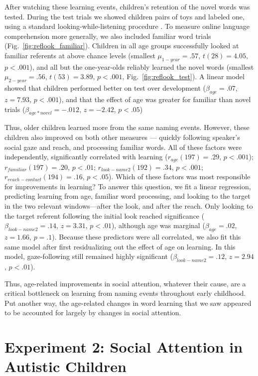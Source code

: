 \documentclass{pnastwo}
\begin{document}
\begin{article}
After watching these learning events, children's retention of the novel words was tested. During the test trials we showed children pairs of toys and labeled one, using a standard looking-while-listening procedure \cite{fernald1998, fernald2008}. To measure online language comprehension more generally, we also included familiar word trials (Fig.~\ref{fig:reflook_familiar}). Children in all age groups successfully looked at familiar referents at above chance levels (smallest $\mu_{1-year} = .57$, $t(28) = 4.05$, $p < .001$), and all but the one-year-olds reliably learned the novel words (smallest $\mu_{2-year} = .56$, $t(53) = 3.89$, $p < .001$, Fig.~\ref{fig:reflook_test}). A linear model showed that children performed better on test over development ($\beta_{age} = .07$, $z = 7.93$, $p < .001$), and that the effect of age was greater for familiar than novel trials ($\beta_{age * novel} = -.012$, $z = -2.42$, $p < .05$)

Thus, older children learned more from the same naming events. However, these children also improved on both other measures --- quickly following speaker's social gaze and reach, and processing familiar words. All of these factors were independently, significantly correlated with learning ($r_{age}(197) = .29$, $p < .001$); $r_{familiar}(197) = .20$, $p < .01$; $r_{look-name2}(192) = .34$, $p < .001$; $r_{reach-contact}(194) = .16$, $p < .05$). Which of these factors was most responsible for improvements in learning? To answer this question, we fit a linear regression, predicting learning from age, familiar word processing, and looking to the target in the two relevant windows---after the look, and after the reach. Only looking to the target referent following the initial look reached significance ($\beta_{look-name2} = .14$, $z = 3.31$, $p < .01$), although age was marginal ($\beta_{age} = .02$, $z = 1.66$, $p = .1$). Because these predictors were all correlated, we also fit this same model after first residualizing out the effect of age on learning. In this model, gaze-following still remained highly significant ($\beta_{look-name2} = .12$, $z = 2.94$, $p < .01$).

Thus, age-related improvements in social attention, whatever their cause, are a critical bottleneck on learning from naming events throughout early childhood. Put another way, the age-related changes in word learning that we saw appeared to be accounted for largely by changes in social attention.

\section{Experiment 2: Social Attention in Autistic Children}


\end{article}
\end{document}

